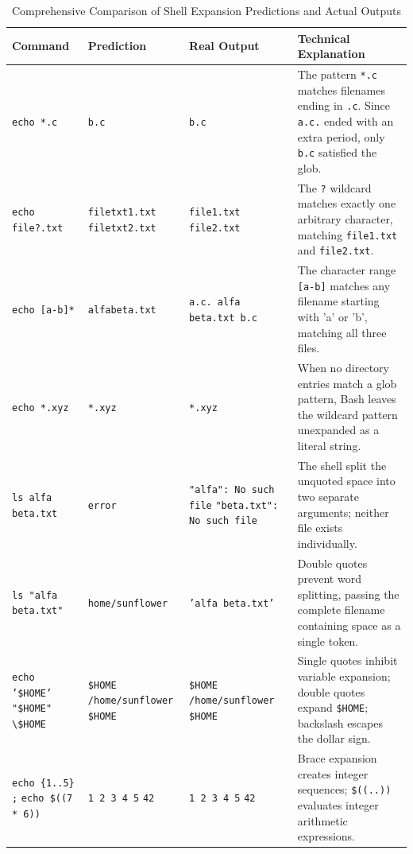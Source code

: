 \documentclass[12pt,a4paper]{article}
\begin{document}
\begin{table}[H]
\centering
\small
\caption{Comprehensive Comparison of Shell Expansion Predictions and Actual Outputs}
\label{tab:predictions_part2}
\begin{tabularx}{\textwidth}{p{3.2cm} p{2.8cm} p{3.2cm} X}
\toprule
\textbf{Command} & \textbf{Prediction} & \textbf{Real Output} & \textbf{Technical Explanation} \\
\midrule
\texttt{echo *.c} & \texttt{b.c} & \texttt{b.c} & The pattern \texttt{*.c} matches filenames ending in \texttt{.c}. Since \texttt{a.c.} ended with an extra period, only \texttt{b.c} satisfied the glob. \\
\addlinespace
\texttt{echo file?.txt} & \texttt{filetxt1.txt} \newline \texttt{filetxt2.txt} & \texttt{file1.txt file2.txt} & The \texttt{?} wildcard matches exactly one arbitrary character, matching \texttt{file1.txt} and \texttt{file2.txt}. \\
\addlinespace
\texttt{echo [a-b]*} & \texttt{alfabeta.txt} & \texttt{a.c. alfa beta.txt b.c} & The character range \texttt{[a-b]} matches any filename starting with 'a' or 'b', matching all three files. \\
\addlinespace
\texttt{echo *.xyz} & \texttt{*.xyz} & \texttt{*.xyz} & When no directory entries match a glob pattern, Bash leaves the wildcard pattern unexpanded as a literal string. \\
\addlinespace
\texttt{ls alfa beta.txt} & \texttt{error} & \texttt{"alfa": No such file} \newline \texttt{"beta.txt": No such file} & The shell split the unquoted space into two separate arguments; neither file exists individually. \\
\addlinespace
\texttt{ls "alfa beta.txt"} & \texttt{home/sunflower} & \texttt{'alfa beta.txt'} & Double quotes prevent word splitting, passing the complete filename containing space as a single token. \\
\addlinespace
\texttt{echo '\$HOME'} \newline \texttt{"\$HOME" \textbackslash\$HOME} & \texttt{\$HOME} \newline \texttt{/home/sunflower} \newline \texttt{\$HOME} & \texttt{\$HOME /home/sunflower \$HOME} & Single quotes inhibit variable expansion; double quotes expand \texttt{\$HOME}; backslash escapes the dollar sign. \\
\addlinespace
\texttt{echo \{1..5\} ;} \newline \texttt{echo \$((7 * 6))} & \texttt{1 2 3 4 5} \newline \texttt{42} & \texttt{1 2 3 4 5} \newline \texttt{42} & Brace expansion creates integer sequences; \texttt{\$((..))} evaluates integer arithmetic expressions. \\

\end{tabularx}
\end{table}
\end{document}
